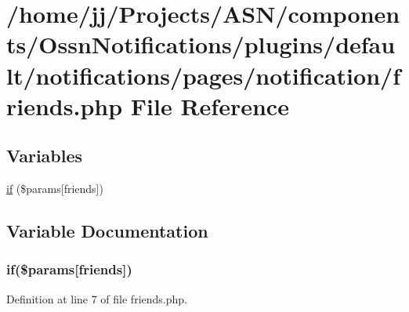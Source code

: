 \hypertarget{_ossn_notifications_2plugins_2default_2notifications_2pages_2notification_2friends_8php}{}\section{/home/jj/\+Projects/\+A\+S\+N/components/\+Ossn\+Notifications/plugins/default/notifications/pages/notification/friends.php File Reference}
\label{_ossn_notifications_2plugins_2default_2notifications_2pages_2notification_2friends_8php}
\subsection*{Variables}
\begin{DoxyCompactItemize}
\item 
\hyperlink{_ossn_notifications_2plugins_2default_2notifications_2pages_2notification_2friends_8php_af17ec5ba4c967afcbe027f2bb3d80a25}{if} (\$params\mbox{[}\textquotesingle{}friends\textquotesingle{}\mbox{]})
\end{DoxyCompactItemize}


\subsection{Variable Documentation}
\subsubsection[{\texorpdfstring{if}{if}}]{\setlength{\rightskip}{0pt plus 5cm}if(\$params\mbox{[}\textquotesingle{}friends\textquotesingle{}\mbox{]})}\hypertarget{_ossn_notifications_2plugins_2default_2notifications_2pages_2notification_2friends_8php_af17ec5ba4c967afcbe027f2bb3d80a25}{}\label{_ossn_notifications_2plugins_2default_2notifications_2pages_2notification_2friends_8php_af17ec5ba4c967afcbe027f2bb3d80a25}


Definition at line 7 of file friends.\+php.

